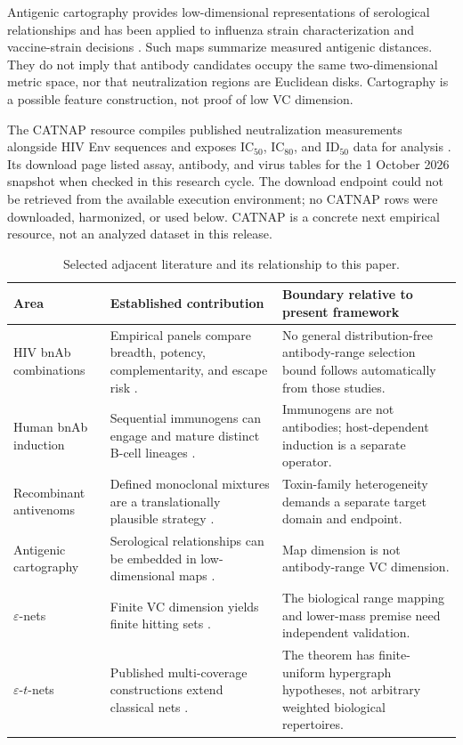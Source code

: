 \documentclass[11pt,a4paper]{article}
\newcommand{\eps}{\varepsilon}
\begin{document}
Antigenic cartography provides low-dimensional representations of serological relationships and has been applied to influenza strain characterization and vaccine-strain decisions \citep{Sitaras2020}. Such maps summarize measured antigenic distances. They do not imply that antibody candidates occupy the same two-dimensional metric space, nor that neutralization regions are Euclidean disks. Cartography is a possible feature construction, not proof of low VC dimension.

The CATNAP resource compiles published neutralization measurements alongside HIV Env sequences and exposes IC$_{50}$, IC$_{80}$, and ID$_{50}$ data for analysis \citep{Yoon2015}. Its download page listed assay, antibody, and virus tables for the 1 October 2026 snapshot when checked in this research cycle. The download endpoint could not be retrieved from the available execution environment; no CATNAP rows were downloaded, harmonized, or used below. CATNAP is a concrete next empirical resource, not an analyzed dataset in this release.

\begin{table}[t]\centering\small\caption{Selected adjacent literature and its relationship to this paper.}\begin{tabularx}{\linewidth}{p{.20\linewidth}p{.35\linewidth}X}\toprule Area&Established contribution&Boundary relative to present framework\\\midrule HIV bnAb combinations&Empirical panels compare breadth, potency, complementarity, and escape risk \citep{JulgBarouch2021,Thavarajah2024}.&No general distribution-free antibody-range selection bound follows automatically from those studies.\\ Human bnAb induction&Sequential immunogens can engage and mature distinct B-cell lineages \citep{HaynesYehBaden2026}.&Immunogens are not antibodies; host-dependent induction is a separate operator.\\ Recombinant antivenoms&Defined monoclonal mixtures are a translationally plausible strategy \citep{Menzies2025}.&Toxin-family heterogeneity demands a separate target domain and endpoint.\\ Antigenic cartography&Serological relationships can be embedded in low-dimensional maps \citep{Sitaras2020}.&Map dimension is not antibody-range VC dimension.\\ $\eps$-nets&Finite VC dimension yields finite hitting sets \citep{HausslerWelzl1987}.&The biological range mapping and lower-mass premise need independent validation.\\ $\eps$-$t$-nets&Published multi-coverage constructions extend classical nets \citep{AlonEtAl2022}.&The theorem has finite-uniform hypergraph hypotheses, not arbitrary weighted biological repertoires.\\\bottomrule\end{tabularx}\label{tab:literature}\end{table}
\end{document}
